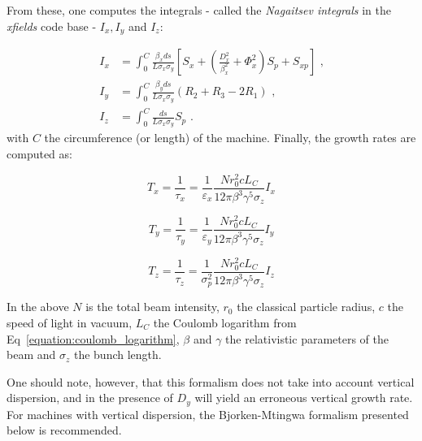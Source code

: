From these, one computes the integrals - called the \textit{Nagaitsev integrals} in the \textit{xfields} code base - \(I_x, I_y\) and \(I_z\):

\begin{equation}
    \begin{aligned}
        I_x &= \int_0^C \frac{\beta_x ds}{L \sigma_x \sigma_y} \left[S_x + \left( \frac{D_x^{2}}{\beta_x^{2}} + \Phi_x^{2} \right) S_p + S_{xp} \right] \text{ ,} \\
        I_y &= \int_0^C \frac{\beta_y ds}{L \sigma_x \sigma_y} \left(R_2 + R_3 - 2 R_1\right) \text{ ,} \\
        I_z &= \int_0^C \frac{ds}{L \sigma_x \sigma_y} S_p \text{ .}
    \end{aligned}
    \label{equation:nagaitsev_integrals}
\end{equation}
with \(C\) the circumference (or length) of the machine.
Finally, the growth rates are computed as:

\begin{equation}
    \boxed{T_x = \frac{1}{\tau_x} = \frac{1}{\varepsilon_x} \frac{N r_0^{2} c L_C}{12 \pi \beta^3 \gamma^5 \sigma_z} I_x}
    \label{equation:nagaitsev_tx}
\end{equation}

\begin{equation}
    \boxed{T_y = \frac{1}{\tau_y} = \frac{1}{\varepsilon_y} \frac{N r_0^{2} c L_C}{12 \pi \beta^3 \gamma^5 \sigma_z} I_y}
    \label{equation:nagaitsev_ty}
\end{equation}

\begin{equation}
    \boxed{T_z = \frac{1}{\tau_z} = \frac{1}{\sigma_p^{2}} \frac{N r_0^{2} c L_C}{12 \pi \beta^3 \gamma^5 \sigma_z} I_z}
    \label{equation:nagaitsev_tz}
\end{equation}

In the above \(N\) is the total beam intensity, \(r_0\) the classical particle radius, \(c\) the speed of light in vacuum, \(L_C\) the Coulomb logarithm from Eq~\eqref{equation:coulomb_logarithm}, \(\beta\) and \(\gamma\) the relativistic parameters of the beam and \(\sigma_z\) the bunch length.
\newline

One should note, however, that this formalism does not take into account vertical dispersion, and in the presence of \(D_y\) will yield an erroneous vertical growth rate.
For machines with vertical dispersion, the Bjorken-Mtingwa formalism presented below is recommended.

